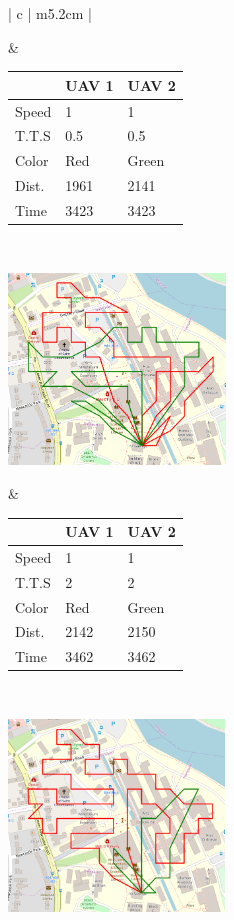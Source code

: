 \begin{table}[h!]
\begin{tabular}{ | c | m{5.2cm} | }
\begin{minipage}[c][53mm][c]{.6\textwidth}
    \end{minipage}
    &
    \small
    \begin{tabular}{m{10mm}|m{11mm} m{11mm} }
        & UAV 1 & UAV 2\\
        \hline
        Speed& 1 & 1 \\
        T.T.S & 0.5 & 0.5 \\
        Color & Red & Green \\
        \hline
        Dist.& 1961 & 2141 \\
        Time& 3423 & 3423 \\
    \end{tabular}
    \normalsize
    \\
    \hline
    
    \begin{minipage}[c][53mm][c]{.6\textwidth}
      \includegraphics[width=\linewidth, height=51mm]{Chapters/MultiAgentCoverage/MultipleTravellingSalesman/Figs/ORToolsSolns/Example3.PNG}

    \end{minipage}
    &
    \small
    \begin{tabular}{m{10mm}|m{11mm} m{11mm}}
        & UAV 1 & UAV 2\\
        \hline
        Speed& 1 & 1 \\
        T.T.S & 2 & 2 \\
        Color & Red & Green \\
        \hline
        Dist.& 2142 & 2150 \\
        Time& 3462 & 3462 \\
    \end{tabular}
    \normalsize
    \\
    \hline
    
    \begin{minipage}[c][53mm][c]{.6\textwidth}
      \includegraphics[width=\linewidth, height=51mm]{Chapters/MultiAgentCoverage/MultipleTravellingSalesman/Figs/ORToolsSolns/Example4.PNG}


\end{minipage}
\end{tabular}
\end{table}
